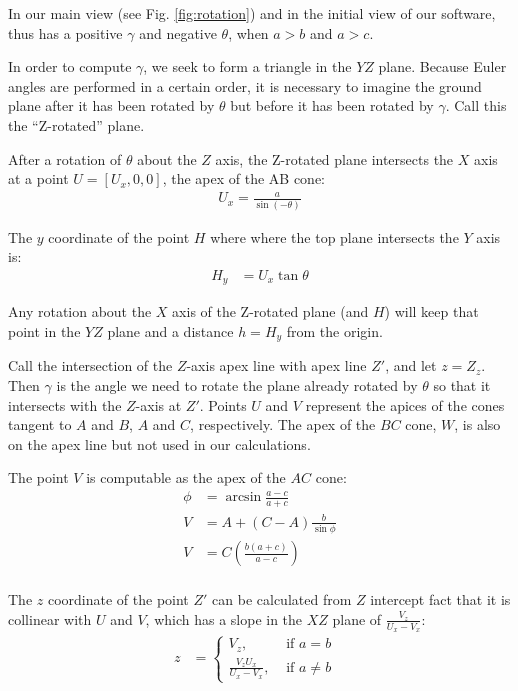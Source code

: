 \documentclass{article}
\begin{document}
In our main view (see Fig. \ref{fig:rotation}) and in the initial view
of our software, thus has a positive $\gamma$ and negative $\theta$, when $a > b$ and $a > c$.

In order to compute $\gamma$, we seek to form a triangle in the $YZ$ plane.
Because Euler angles are performed in a certain order, it is necessary to imagine
the ground plane after it has been rotated by $\theta$ but before it has been rotated by $\gamma$.
Call this the ``Z-rotated'' plane.



After a rotation of $\theta$ about the $Z$ axis, the Z-rotated plane intersects the $X$ axis
at a point $U = [U_x,0,0]$, the apex of the AB cone:
\begin{align}
  U_x = \frac{a}{\sin{(-\theta)}}
\end{align}

The $y$ coordinate of the point $H$ where where the top plane intersects
the $Y$ axis is:
\begin{align}
  H_y &= U_x \tan{\theta}
\end{align}

Any rotation about the $X$ axis of the Z-rotated plane (and $H$) will keep that
point in the $YZ$ plane and a distance $ h = H_y$ from the origin.

Call the intersection
of the $Z$-axis apex line with apex line $Z'$, and let $z = Z_z$.
Then $\gamma$ is the angle we need to rotate the plane already rotated by $\theta$ so that it intersects with the
$Z$-axis at $Z'$.
Points $U$ and $V$ represent the apices of the cones tangent to $A$ and $B$, $A$ and $C$, respectively.
The apex of the $BC$ cone, $W$, is also on the apex line but not used in our calculations.

The point $V$ is computable as the apex of the $AC$ cone:
\begin{align}
  \phi &= \arcsin{\frac{a - c}{a + c}} \\
  V &= A + (C-A) \frac{b}{\sin{\phi}} \\
  V &= C (\frac{b(a+c)}{a-c}) \\
\end{align}

The $z$ coordinate of the point $Z'$ can be calculated from
$Z$ intercept
fact that it is collinear with $U$ and $V$, which has a slope
in the $XZ$ plane of $\frac{V_z}{U_x-V_x}$:
\begin{align}
  z&= \begin{cases}
    V_z, & \text{ if $a = b$ } \\
    \frac{V_z U_x}{U_x - V_x}, & \text{ if  $a \neq b$}
  \end{cases}
  \label{eq:zprime} \\
\end{align}
\end{document}
